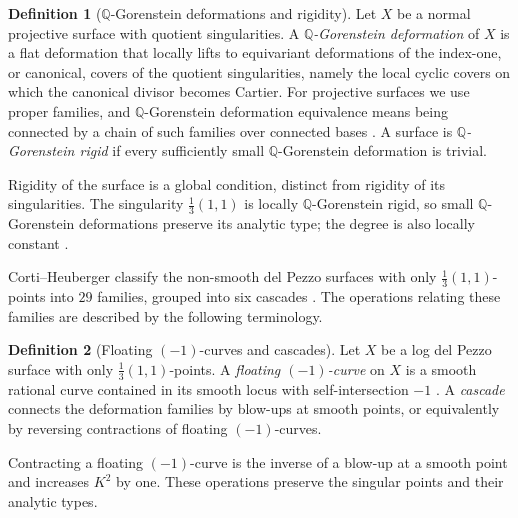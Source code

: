 \documentclass[11pt]{article}
\theoremstyle{plain}
\theoremstyle{definition}
\newtheorem{definition}[definition]{Definition}
\theoremstyle{remark}
\begin{document}
\begin{definition}[\(\mathbb Q\)-Gorenstein deformations and rigidity]
\label{def:qg-deformations}
Let \(X\) be a normal projective surface with quotient singularities.
A \emph{\(\mathbb Q\)-Gorenstein deformation} of \(X\) is a flat deformation
that locally lifts to equivariant
deformations of the index-one, or canonical, covers of the quotient
singularities, namely the local cyclic covers on which the canonical
divisor becomes Cartier.
For projective surfaces we use proper families, and \(\mathbb Q\)-Gorenstein deformation
equivalence means being connected by a chain of such families over
connected bases \cite[Basic Concepts, Definition~2 and proof of Lemma~6]{AkhtarEtAl2016}.
A surface is \emph{\(\mathbb Q\)-Gorenstein rigid} if every sufficiently small
\(\mathbb Q\)-Gorenstein deformation is trivial.
\end{definition}

Rigidity of the surface is a global condition, distinct from rigidity of
its singularities. The singularity \(\frac13(1,1)\) is
locally \(\mathbb Q\)-Gorenstein rigid, so small \(\mathbb Q\)-Gorenstein
deformations preserve its analytic
type; the degree is also locally constant \cite[Section~1.1.1]{Corti2016}.

Corti--Heuberger classify the non-smooth del Pezzo surfaces with only
\(\frac13(1,1)\)-points into \(29\) families, grouped into six cascades
\cite[Theorems~3--4]{Corti2016}. The operations relating these families
are described by the following terminology.

\begin{definition}[Floating \((-1)\)-curves and cascades]
\label{def:floating-curves-cascades}
Let \(X\) be a log del Pezzo surface with only \(\frac13(1,1)\)-points.
A \emph{floating \((-1)\)-curve} on \(X\) is a smooth rational curve
contained in its smooth locus with self-intersection \(-1\)
\cite[Definition~5]{Corti2016}. A \emph{cascade} connects the deformation
families by blow-ups at smooth points, or equivalently by reversing
contractions of floating \((-1)\)-curves.
\end{definition}

Contracting a floating \((-1)\)-curve is the inverse of a blow-up at a
smooth point and increases \(K^2\) by one. These operations preserve
the singular points and their analytic types.
\end{document}
